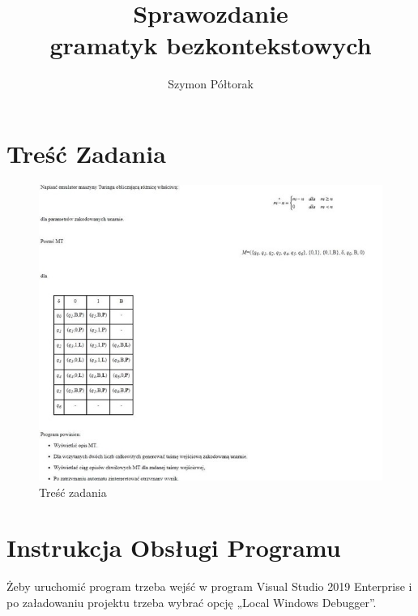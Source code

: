 \documentclass[10pt, a4paper]{report}
\title{\huge{\textbf{Sprawozdanie}}\\ gramatyk bezkontekstowych}
\author{Szymon Półtorak}
\date{}
\begin{document}
    \maketitle

    \renewcommand*\thesection{\arabic{section}} 
    
    \pagestyle{fancy}
    \fancyhf{}
    
    \tableofcontents
    \newpage

    \section{Treść Zadania}
    
    \begin{figure}[h]
        \begin{center}
            \includegraphics[scale=0.9]{photo1.jpg}
            \caption{Treść zadania}
        \end{center}
    \end{figure}
    \newpage

    \section{Instrukcja Obsługi Programu}
    Żeby uruchomić program trzeba wejść w program Visual Studio 2019 Enterprise i po załadowaniu projektu trzeba wybrać
    opcję „Local Windows Debugger”.
\end{document}
